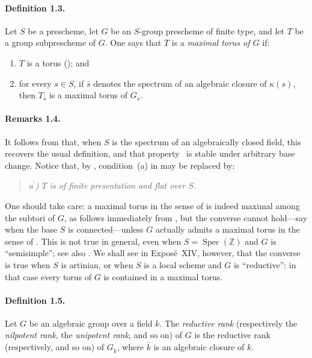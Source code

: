 \paragraph{\textbf{Definition 1.3.}}
Let \(S\) be a prescheme, let \(G\) be an \(S\)-group prescheme of
finite type, and let \(T\) be a group subprescheme of \(G\). One says
that \(T\) is a \emph{maximal torus of \(G\)} if:
\begin{enumerate}
\renewcommand{\labelenumi}{\alph{enumi})}
\item \(T\) is a torus (); and
\item for every \(s\in S\), if \(\bar s\) denotes the spectrum of an
  algebraic closure of \(\kappa(s)\), then \(T_{\bar s}\) is a
  maximal torus of \(G_{\bar s}\).
\end{enumerate}

\paragraph{\textbf{Remarks 1.4.}}
It follows from  that, when \(S\) is the spectrum of an
algebraically closed field, this recovers the usual definition, and
that property~ is stable under arbitrary base change. Notice that,
by , condition~(a) in  may be replaced by:
\begin{quote}
\textit{a\(^{\prime}\)) \(T\) is of finite presentation and flat over
\(S\).}
\end{quote}

One should take care: a maximal torus in the sense of 
is indeed maximal among the subtori of \(G\), as follows immediately
from , but the converse cannot hold---say when the base \(S\) is
connected---unless \(G\) actually admits a maximal torus in the sense
of . This is not true in general, even when
\(S=\operatorname{Spec}(\mathbb Z)\) and \(G\) is ``semisimple''; see
also . We shall see in Exposé~XIV, however, that the converse is
true when \(S\) is artinian, or when \(S\) is a local scheme and \(G\)
is ``reductive'': in that case every torus of \(G\) is contained in a
maximal torus.

\paragraph{\textbf{Definition 1.5.}}
Let \(G\) be an algebraic group over a field \(k\). The
\emph{reductive rank} (respectively the \emph{nilpotent rank}, the
\emph{unipotent rank}, and so on) of \(G\) is the reductive rank
(respectively, and so on) of \(G_{\bar k}\), where \(\bar k\) is an
algebraic closure of \(k\).

